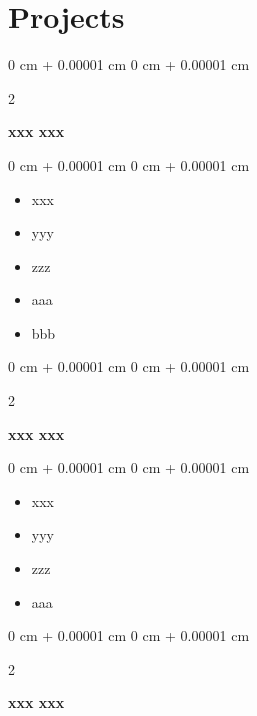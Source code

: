 \documentclass[10pt, letterpaper]{article}
\newenvironment{highlights}{
    \begin{itemize}[
        topsep=0.10 cm,
        parsep=0.10 cm,
        partopsep=0pt,
        itemsep=0pt,
        leftmargin=0 cm + 10pt
    ]
}{
    \end{itemize}
} %
\newenvironment{onecolentry}{
    \begin{adjustwidth}{
        0 cm + 0.00001 cm
    }{
        0 cm + 0.00001 cm
    }
}{
    \end{adjustwidth}
} %
\newenvironment{twocolentry}[2][]{
    \onecolentry
    \def\secondColumn{#2}
    \setcolumnwidth{\fill, 4.5 cm}
    \begin{paracol}{2}
}{
    \switchcolumn \raggedleft \secondColumn
    \end{paracol}
    \endonecolentry
} %
\begin{document}
    \section{Projects}

        \begin{twocolentry}{
            
        }
            \textbf{xxx xxx}\end{twocolentry}

        \vspace{0.10 cm}
        \begin{onecolentry}
            \begin{highlights}
                \item xxx 
                \item yyy
                \item zzz
                \item aaa
                \item bbb
            \end{highlights}
        \end{onecolentry}

        \vspace{0.2 cm}

        \begin{twocolentry}{
            
        }
            \textbf{xxx xxx}\end{twocolentry}

        \vspace{0.10 cm}
        \begin{onecolentry}
            \begin{highlights}
                \item xxx
                \item yyy
                \item zzz
                \item aaa
                
            \end{highlights}
        \end{onecolentry}

        \vspace{0.2 cm}

        \begin{twocolentry}{
            
        }
            \textbf{xxx xxx}\end{twocolentry}
\end{document}
